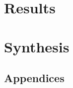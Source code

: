 \part{Results}

\part{Synthesis}


	
\printbibliography
\clearpage



\cleardoublepage
\begin{appendices}
	\chapter{Appendices}







\end{appendices}




